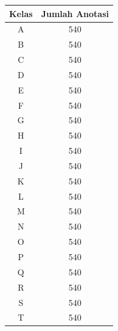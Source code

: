 \begin{table}[H]
  \begin{center}
    \begin{tabular}{|c|c|}
    \hline
    \textbf{Kelas} & \textbf{Jumlah Anotasi} \\ \hline
    A                                    & 540                     \\ \hline
    B                                    & 540                     \\ \hline
    C                                    & 540                     \\ \hline
    D                                    & 540                     \\ \hline
    E                                    & 540                     \\ \hline
    F                                    & 540                     \\ \hline
    G                                    & 540                     \\ \hline
    H                                    & 540                     \\ \hline
    I                                    & 540                     \\ \hline
    J                                    & 540                     \\ \hline
    K                                    & 540                     \\ \hline
    L                                    & 540                     \\ \hline
    M                                    & 540                     \\ \hline
    N                                    & 540                     \\ \hline
    O                                    & 540                     \\ \hline
    P                                    & 540                     \\ \hline
    Q                                    & 540                     \\ \hline
    R                                    & 540                     \\ \hline
    S                                    & 540                     \\ \hline
    T                                    & 540                     \\ \hline

\end{tabular}
\end{center}
\end{table}
